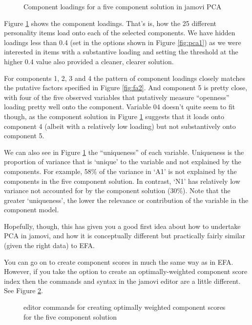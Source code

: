 \begin{figure}[!htb]
\begin{center}
\caption{Component loadings for a five component solution in jamovi PCA}
\label{fig:pca5}
\HR
\end{center}
\end{figure}

Figure \ref{fig:pca5} shows the component loadings. That's is, how the 25 different personality items load onto each of the selected components. We have hidden loadings less than 0.4 (set in the options shown in Figure \ref{fig:pca1}) as we were interested in items with a substantive loading and setting the threshold at the higher 0.4 value also provided a cleaner, clearer solution. 

For components 1, 2, 3 and 4 the pattern of component loadings closely matches the putative factors specified in Figure \ref{fig:fa2}. And component 5 is pretty close, with four of the five observed variables that putatively measure “openness” loading pretty well onto the component. Variable 04 doesn’t quite seem to fit though, as the component solution in Figure \ref{fig:pca5} suggests that it loads onto component 4 (albeit with a relatively low loading) but not substantively onto component 5.

We can also see in Figure \ref{fig:pca5} the “uniqueness” of each variable. Uniqueness is the proportion of variance that is ‘unique’ to the variable and not explained by the components. For example, 58\% of the variance in ‘A1’ is not explained by the components in the five component solution. In contrast, ‘N1’ has relatively low variance not accounted for by the component solution (30\%). Note that the greater ‘uniqueness’, the lower the relevance or contribution of the variable in the component model. 

Hopefully, though, this has given you a good first idea about how to undertake PCA in jamovi, and how it is conceptually different but practically fairly similar (given the right data) to EFA.

You can go on to create component scores in much the same way as in EFA. However, if you take the option to create an optimally-weighted component score index then the commands and syntax in the jamovi  editor are a little different. See Figure \ref{fig:pca6}. 

\begin{figure}[!htb]
\begin{center}
\caption{ editor commands for creating optimally weighted component scores for the five component solution}
\label{fig:pca6}
\HR
\end{center}
\end{figure}


